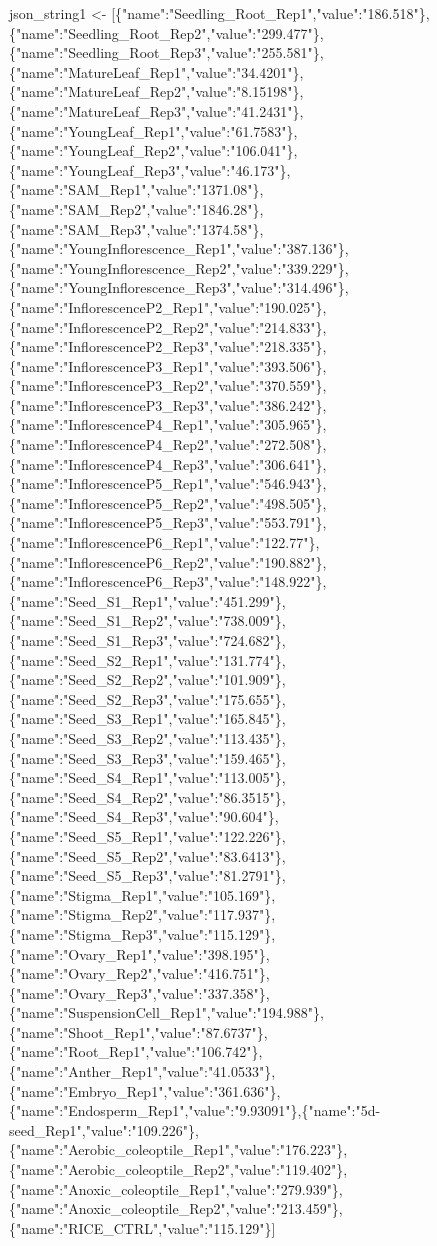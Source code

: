 \documentclass[
]{article}
\newenvironment{Shaded}{\begin{snugshade}}{\end{snugshade}}
\newcommand{\NormalTok}[1]{#1}
\newcommand{\OtherTok}[1]{\textcolor[rgb]{0.56,0.35,0.01}{#1}}
\newcommand{\StringTok}[1]{\textcolor[rgb]{0.31,0.60,0.02}{#1}}
\begin{document}
\begin{Shaded}
\begin{Highlighting}[]
\NormalTok{json\_string1 }\OtherTok{\textless{}{-}} \StringTok{\textquotesingle{}[\{"name":"Seedling\_Root\_Rep1","value":"186.518"\},\{"name":"Seedling\_Root\_Rep2","value":"299.477"\},\{"name":"Seedling\_Root\_Rep3","value":"255.581"\},\{"name":"MatureLeaf\_Rep1","value":"34.4201"\},\{"name":"MatureLeaf\_Rep2","value":"8.15198"\},\{"name":"MatureLeaf\_Rep3","value":"41.2431"\},\{"name":"YoungLeaf\_Rep1","value":"61.7583"\},\{"name":"YoungLeaf\_Rep2","value":"106.041"\},\{"name":"YoungLeaf\_Rep3","value":"46.173"\},\{"name":"SAM\_Rep1","value":"1371.08"\},\{"name":"SAM\_Rep2","value":"1846.28"\},\{"name":"SAM\_Rep3","value":"1374.58"\},\{"name":"YoungInflorescence\_Rep1","value":"387.136"\},\{"name":"YoungInflorescence\_Rep2","value":"339.229"\},\{"name":"YoungInflorescence\_Rep3","value":"314.496"\},\{"name":"InflorescenceP2\_Rep1","value":"190.025"\},\{"name":"InflorescenceP2\_Rep2","value":"214.833"\},\{"name":"InflorescenceP2\_Rep3","value":"218.335"\},\{"name":"InflorescenceP3\_Rep1","value":"393.506"\},\{"name":"InflorescenceP3\_Rep2","value":"370.559"\},\{"name":"InflorescenceP3\_Rep3","value":"386.242"\},\{"name":"InflorescenceP4\_Rep1","value":"305.965"\},\{"name":"InflorescenceP4\_Rep2","value":"272.508"\},\{"name":"InflorescenceP4\_Rep3","value":"306.641"\},\{"name":"InflorescenceP5\_Rep1","value":"546.943"\},\{"name":"InflorescenceP5\_Rep2","value":"498.505"\},\{"name":"InflorescenceP5\_Rep3","value":"553.791"\},\{"name":"InflorescenceP6\_Rep1","value":"122.77"\},\{"name":"InflorescenceP6\_Rep2","value":"190.882"\},\{"name":"InflorescenceP6\_Rep3","value":"148.922"\},\{"name":"Seed\_S1\_Rep1","value":"451.299"\},\{"name":"Seed\_S1\_Rep2","value":"738.009"\},\{"name":"Seed\_S1\_Rep3","value":"724.682"\},\{"name":"Seed\_S2\_Rep1","value":"131.774"\},\{"name":"Seed\_S2\_Rep2","value":"101.909"\},\{"name":"Seed\_S2\_Rep3","value":"175.655"\},\{"name":"Seed\_S3\_Rep1","value":"165.845"\},\{"name":"Seed\_S3\_Rep2","value":"113.435"\},\{"name":"Seed\_S3\_Rep3","value":"159.465"\},\{"name":"Seed\_S4\_Rep1","value":"113.005"\},\{"name":"Seed\_S4\_Rep2","value":"86.3515"\},\{"name":"Seed\_S4\_Rep3","value":"90.604"\},\{"name":"Seed\_S5\_Rep1","value":"122.226"\},\{"name":"Seed\_S5\_Rep2","value":"83.6413"\},\{"name":"Seed\_S5\_Rep3","value":"81.2791"\},\{"name":"Stigma\_Rep1","value":"105.169"\},\{"name":"Stigma\_Rep2","value":"117.937"\},\{"name":"Stigma\_Rep3","value":"115.129"\},\{"name":"Ovary\_Rep1","value":"398.195"\},\{"name":"Ovary\_Rep2","value":"416.751"\},\{"name":"Ovary\_Rep3","value":"337.358"\},\{"name":"SuspensionCell\_Rep1","value":"194.988"\},\{"name":"Shoot\_Rep1","value":"87.6737"\},\{"name":"Root\_Rep1","value":"106.742"\},\{"name":"Anther\_Rep1","value":"41.0533"\},\{"name":"Embryo\_Rep1","value":"361.636"\},\{"name":"Endosperm\_Rep1","value":"9.93091"\},\{"name":"5d{-}seed\_Rep1","value":"109.226"\}, \{"name":"Aerobic\_coleoptile\_Rep1","value":"176.223"\},\{"name":"Aerobic\_coleoptile\_Rep2","value":"119.402"\},\{"name":"Anoxic\_coleoptile\_Rep1","value":"279.939"\},\{"name":"Anoxic\_coleoptile\_Rep2","value":"213.459"\}, \{"name":"RICE\_CTRL","value":"115.129"\}]\textquotesingle{}}

\end{Highlighting}
\end{Shaded}
\end{document}
